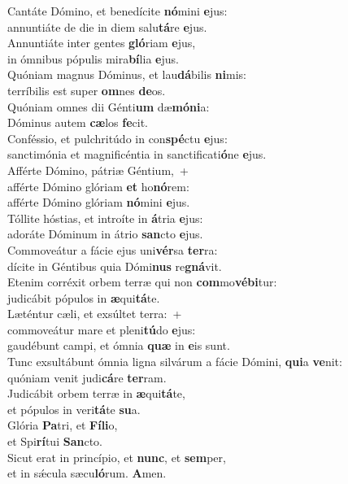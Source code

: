 \evenverse Cantáte Dómino, et benedícite \textbf{nó}mini \textbf{e}jus:~\*\\
\evenverse annuntiáte de die in diem salu\textbf{tá}re \textbf{e}jus.\\
\oddverse Annuntiáte inter gentes \textbf{gló}riam \textbf{e}jus,~\*\\
\oddverse in ómnibus pópulis mira\textbf{bí}lia \textbf{e}jus.\\
\evenverse Quóniam magnus Dóminus, et lau\textbf{dá}bilis \textbf{ni}mis:~\*\\
\evenverse terríbilis est super \textbf{om}nes \textbf{de}os.\\
\oddverse Quóniam omnes dii Génti\textbf{um} dæ\textbf{mó}\textbf{ni}a:~\*\\
\oddverse Dóminus autem \textbf{cæ}los \textbf{fe}cit.\\
\evenverse Conféssio, et pulchritúdo in con\textbf{spé}ctu \textbf{e}jus:~\*\\
\evenverse sanctimónia et magnificéntia in sanctificati\textbf{ó}ne \textbf{e}jus.\\
\oddverse Afférte Dómino, pátriæ Géntium,~+\\
\oddverse  afférte Dómino glóriam \textbf{et} ho\textbf{nó}rem:~\*\\
\oddverse afférte Dómino glóriam \textbf{nó}mini \textbf{e}jus.\\
\evenverse Tóllite hóstias, et introíte in \textbf{á}tria \textbf{e}jus:~\*\\
\evenverse adoráte Dóminum in átrio \textbf{san}cto \textbf{e}jus.\\
\oddverse Commoveátur a fácie ejus uni\textbf{vér}sa \textbf{ter}ra:~\*\\
\oddverse dícite in Géntibus quia Dómi\textbf{nus} re\textbf{gná}vit.\\
\evenverse Etenim corréxit orbem terræ qui non \textbf{com}mo\textbf{vé}\textbf{bi}tur:~\*\\
\evenverse judicábit pópulos in \textbf{æ}qui\textbf{tá}te.\\
\oddverse Læténtur cæli, et exsúltet terra:~+\\
\oddverse  commoveátur mare et pleni\textbf{tú}do \textbf{e}jus:~\*\\
\oddverse gaudébunt campi, et ómnia \textbf{quæ} in \textbf{e}is sunt.\\
\evenverse Tunc exsultábunt ómnia ligna silvárum a fácie Dómini, \textbf{qui}a \textbf{ve}nit:~\*\\
\evenverse quóniam venit judi\textbf{cá}re \textbf{ter}ram.\\
\oddverse Judicábit orbem terræ in \textbf{æ}qui\textbf{tá}te,~\*\\
\oddverse et pópulos in veri\textbf{tá}te \textbf{su}a.\\
\evenverse Glória \textbf{Pa}tri, et \textbf{Fí}\textbf{li}o,~\*\\
\evenverse et Spi\textbf{rí}tui \textbf{San}cto.\\
\oddverse Sicut erat in princípio, et \textbf{nunc}, et \textbf{sem}per,~\*\\
\oddverse et in sǽcula sæcu\textbf{ló}rum. \textbf{A}men.\\
